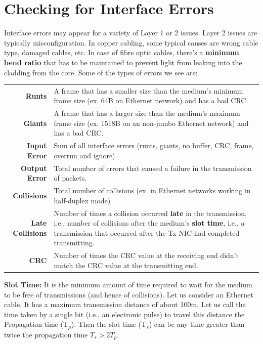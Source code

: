 \section{Checking for Interface Errors}
Interface errors may appear for a variety of Layer 1 or 2 issues. Layer 2 issues are typically misconfiguration. In copper cabling, some typical causes are wrong cable type, damaged cables, etc. In case of fibre optic cables, there's a \textbf{minimum bend ratio} that has to be maintained to prevent light from leaking into the cladding from the core. Some of the types of errors we see are:

\vspace{-10pt}
\begin{center}
	\begin{tabular}{rm{}}
		\toprule
		\textbf{Runts} &A frame that has a smaller size than the medium's minimum frame size (ex. 64B on Ethernet network) and has a bad CRC.\\
		\textbf{Giants} &A frame that has a larger size than the medium's maximum frame size (ex. 1518B on an non-jumbo Ethernet network) and has a bad CRC.\\
		\textbf{Input Error} &Sum of all interface errors (runts, giants, no buffer, CRC, frame, overrun and ignore) \\
		\textbf{Output Error} &Total number of errors that caused a failure in the transmission of packets.\\
		\textbf{Collisions} &Total number of collisions (ex. in Ethernet networks working in half-duplex mode)\\
		\textbf{Late Collisions} &Number of times a collision occurred \textbf{late} in the transmission, i.e., number of collisions after the medium's \textbf{slot time}, i.e., a transmission that occurred after the Tx NIC had completed transmitting.\\
		\textbf{CRC} &Number of times the CRC value at the receiving end didn't match the CRC value at the transmitting end.\\
		\bottomrule
	\end{tabular}
\end{center}
\vspace{-10pt}
\noindent
\textbf{Slot Time:} It is the minimum amount of time required to wait for the medium to be free of transmissions (and hence of collisions). Let us consider an Ethernet cable. It has a maximum transmission distance of about 100m. Let us call the time taken by a single bit (i.e., an electronic pulse) to travel this distance the Propagation time (T$_p$). Then the slot time (T$_s$) can be any time greater than twice the propagation time $T_s > 2T_p$. 

